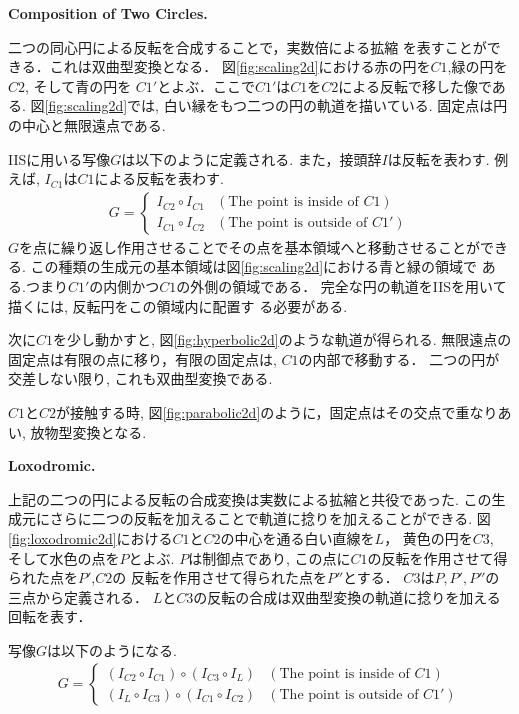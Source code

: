 \noindent\textbf{Composition of Two Circles.}

二つの同心円による反転を合成することで，実数倍による拡縮
を表すことができる．これは双曲型変換となる．
図\ref{fig:scaling2d}における赤の円を$C1$,緑の円を$C2$, そして青の円を
$C1'$とよぶ．ここで$C1'$は$C1$を$C2$による反転で移した像である.
図\ref{fig:scaling2d}では, 白い縁をもつ二つの円の軌道を描いている.
固定点は円の中心と無限遠点である.

IISに用いる写像$G$は以下のように定義される.
また，接頭辞$I$は反転を表わす.
例えば, $I_{C1}$は$C1$による反転を表わす.
\begin{align*}
 G =
  \begin{cases}
   I_{C2} \circ I_{C1} & (\text{The point is inside of } C1) \\
   I_{C1} \circ I_{C2} & (\text{The point is outside of } C1')
  \end{cases}
\end{align*}
$G$を点に繰り返し作用させることでその点を基本領域へと移動させることができる.
この種類の生成元の基本領域は図\ref{fig:scaling2d}における青と緑の領域で
ある.つまり$C1'$の内側かつ$C1$の外側の領域である．
完全な円の軌道をIISを用いて描くには, 反転円をこの領域内に配置す
る必要がある.

次に$C1$を少し動かすと, 図\ref{fig:hyperbolic2d}のような軌道が得られる.
無限遠点の固定点は有限の点に移り，有限の固定点は, $C1$の内部で移動する．
二つの円が交差しない限り, これも双曲型変換である.

$C1$と$C2$が接触する時, 図\ref{fig:parabolic2d}のように，固定点はその交点で重なりあい, 放物型変換となる.

\noindent\textbf{Loxodromic.}

上記の二つの円による反転の合成変換は実数による拡縮と共役であった.
この生成元にさらに二つの反転を加えることで軌道に捻りを加えることができる.
図\ref{fig:loxodromic2d}における$C1$と$C2$の中心を通る白い直線を$L$，
黄色の円を$C3$, そして水色の点を$P$とよぶ.
$P$は制御点であり, この点に$C1$の反転を作用させて得られた点を$P'$,$C2$の
反転を作用させて得られた点を$P''$とする．
$C3$は$P, P', P''$の三点から定義される．
$L$と$C3$の反転の合成は双曲型変換の軌道に捻りを加える回転を表す．

写像$G$は以下のようになる.
\begin{align*}
G =
\begin{cases}
 (I_{C2} \circ I_{C1}) \circ (I_{C3} \circ I_L) & (\text{The point is inside of } C1) \\
 (I_L \circ I_{C3}) \circ (I_{C1} \circ I_{C2}) & (\text{The point is outside of }C1')
\end{cases}
\end{align*}

